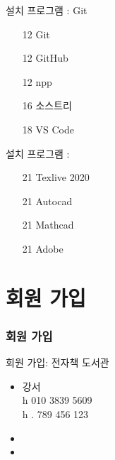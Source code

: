 \documentclass[aspectratio=1610,20pt,xcolor=pdftex,dvipsnames,table,handout]{beamer}
\begin{document}
		\begin{frame} [t,plain]

			\begin{block}  {설치 프로그램 : Git }
			\setlength{\leftmargini}{2em}			
			\begin{itemize}
				\item [12]	 Git
				\item [12]	 GitHub
				\item [12]	 npp
				\item [16]		소스트리
				\item [18]		VS Code
			\end{itemize}
			\end{block}						

			\begin{block}  {설치 프로그램 : }
			\setlength{\leftmargini}{2em}			
			\begin{itemize}
				\item [21] 	Texlive 2020
				\item [21] 	Autocad
				\item [21] 	Mathcad
				\item [21] 	Adobe
			\end{itemize}
			\end{block}						

		\end{frame}						

		\section{회원 가입 }

		\begin{frame} [t,plain]
		\frametitle{회원 가입 }
		\end{frame}						

		\begin{frame} [t,plain]

			\begin{block} {회원 가입: 전자책 도서관 }
			\setlength{\leftmargini}{2em}			
			\begin{itemize}
				\item 강서 \\
						h 010 3839 5609 \hrulefill \\
						h . 789 456 123 \hrulefill \\
				\item 
				\item 
			\end{itemize}
			\end{block}						

		\end{frame}						
\end{document}
